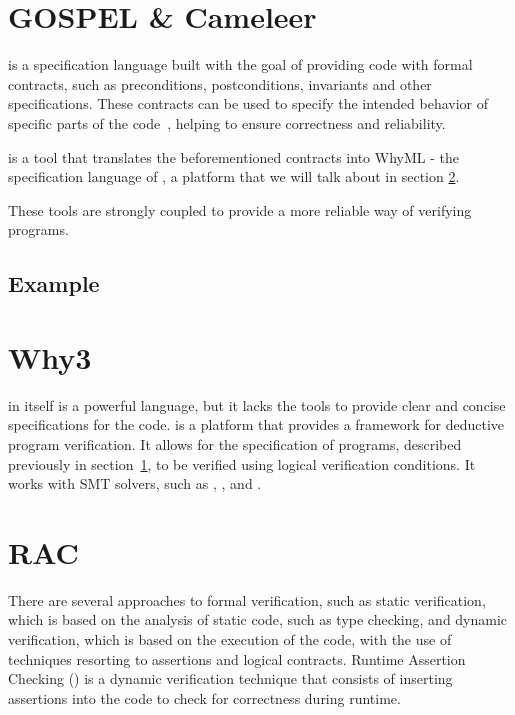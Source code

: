 \section{GOSPEL \& Cameleer}
\label{sec:gospel_and_cameleer}

\gospellang is a specification language built with the goal of providing \ocaml code 
with formal contracts, such as preconditions, postconditions, invariants and other 
specifications. These contracts can be used to specify the intended behavior of 
specific parts of the code~\cite{Soares_Chirica_Pereira2024}, helping to ensure correctness and reliability.

\cameleer is a tool that translates the beforementioned contracts into WhyML - 
the specification language of \why, a platform that we will talk about in 
section \ref{sec:why3}.

These tools are strongly coupled to provide a more reliable way of verifying 
\ocaml programs.

\subsection{Example}
\label{sub:example}


\section{Why3}
\label{sec:why3}

\ocaml in itself is a powerful language, but it lacks the tools to provide clear 
and concise specifications for the code. \why is a platform that provides a framework 
for deductive program verification. It allows for the specification of programs, 
described previously in section~\ref{sec:gospel_and_cameleer}, to be verified using 
logical verification conditions. It works with SMT solvers, such as \zthree, \altergo, 
and \coq.

\section{RAC}
\label{sec:rac}

There are several approaches to formal verification, such as static verification, 
which is based on the analysis of static code, such as type checking, and dynamic 
verification, which is based on the execution of the code, with the use of 
techniques resorting to assertions and logical contracts. Runtime Assertion Checking 
(\rac) is a dynamic verification technique that consists of inserting assertions 
into the code to check for correctness during runtime.

